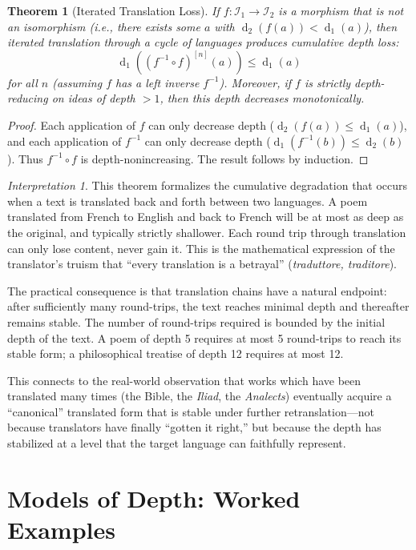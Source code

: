 \documentclass[11pt,openany]{book}
\theoremstyle{definition}
\theoremstyle{plain}
\newtheorem{theorem}[axiom]{Theorem}
\theoremstyle{remark}
\newtheorem{interpretation}[axiom]{Interpretation}
\newcommand{\IS}{\mathcal{I}}               %
\newcommand{\depth}{\operatorname{d}}       %
\begin{document}
\begin{theorem}[Iterated Translation Loss]
\label{thm:iterated-translation-loss}
If $f : \IS_1 \to \IS_2$ is a morphism that is not an isomorphism (i.e., there exists some $a$ with $\depth_2(f(a)) < \depth_1(a)$), then iterated translation through a cycle of languages produces cumulative depth loss:
\[
\depth_1((f^{-1} \circ f)^{[n]}(a)) \leq \depth_1(a)
\]
for all $n$ (assuming $f$ has a left inverse $f^{-1}$). Moreover, if $f$ is strictly depth-reducing on ideas of depth $> 1$, then this depth decreases monotonically.
\end{theorem}

\begin{proof}
Each application of $f$ can only decrease depth ($\depth_2(f(a)) \leq \depth_1(a)$), and each application of $f^{-1}$ can only decrease depth ($\depth_1(f^{-1}(b)) \leq \depth_2(b)$). Thus $f^{-1} \circ f$ is depth-nonincreasing. The result follows by induction.
\end{proof}

\begin{interpretation}
This theorem formalizes the cumulative degradation that occurs when a text is translated back and forth between two languages. A poem translated from French to English and back to French will be at most as deep as the original, and typically strictly shallower. Each round trip through translation can only lose content, never gain it. This is the mathematical expression of the translator's truism that ``every translation is a betrayal'' (\textit{traduttore, traditore}).

The practical consequence is that translation chains have a natural endpoint: after sufficiently many round-trips, the text reaches minimal depth and thereafter remains stable. The number of round-trips required is bounded by the initial depth of the text. A poem of depth 5 requires at most 5 round-trips to reach its stable form; a philosophical treatise of depth 12 requires at most 12.

This connects to the real-world observation that works which have been translated many times (the Bible, the \emph{Iliad}, the \emph{Analects}) eventually acquire a ``canonical'' translated form that is stable under further retranslation---not because translators have finally ``gotten it right,'' but because the depth has stabilized at a level that the target language can faithfully represent.
\end{interpretation}

\section{Models of Depth: Worked Examples}
\end{document}
